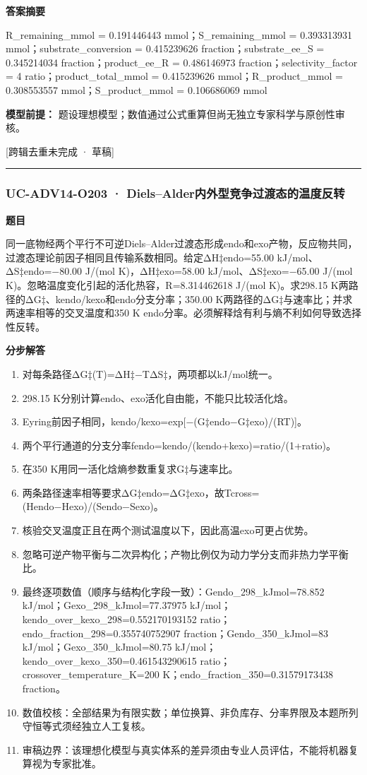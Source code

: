 \documentclass[UTF8,11pt,a4paper]{ctexart}
\begin{document}
\noindent\textbf{答案摘要}\par
R\_remaining\_mmol = 0.191446443 mmol；S\_remaining\_mmol = 0.393313931 mmol；substrate\_conversion = 0.415239626 fraction；substrate\_ee\_S = 0.345214034 fraction；product\_ee\_R = 0.486146973 fraction；selectivity\_factor = 4 ratio；product\_total\_mmol = 0.415239626 mmol；R\_product\_mmol = 0.308553557 mmol；S\_product\_mmol = 0.106686069 mmol\par
\noindent\textbf{模型前提：}
题设理想模型；数值通过公式重算但尚无独立专家科学与原创性审核。\par
\noindent\textcolor{red!65!black}{[跨辑去重未完成 · 草稿]} \par
\medskip\hrule\medskip
{}
\subsubsection*{UC-ADV14-O203 · Diels–Alder内外型竞争过渡态的温度反转}
\noindent\textbf{题目}\par
同一底物经两个平行不可逆Diels–Alder过渡态形成endo和exo产物，反应物共同，过渡态理论前因子相同且传输系数相同。给定ΔH‡endo=55.00 kJ/mol、ΔS‡endo=−80.00 J/(mol K)，ΔH‡exo=58.00 kJ/mol、ΔS‡exo=−65.00 J/(mol K)。忽略温度变化引起的活化热容，R=8.314462618 J/(mol K)。求298.15 K两路径的ΔG‡、kendo/kexo和endo分支分率；350.00 K两路径的ΔG‡与速率比；并求两速率相等的交叉温度和350 K endo分率。必须解释焓有利与熵不利如何导致选择性反转。\par
\medskip\noindent\textbf{分步解答}
\begin{enumerate}
\item 对每条路径ΔG‡(T)=ΔH‡−TΔS‡，两项都以kJ/mol统一。
\item 298.15 K分别计算endo、exo活化自由能，不能只比较活化焓。
\item Eyring前因子相同，kendo/kexo=exp[−(G‡endo−G‡exo)/(RT)]。
\item 两个平行通道的分支分率fendo=kendo/(kendo+kexo)=ratio/(1+ratio)。
\item 在350 K用同一活化焓熵参数重复求G‡与速率比。
\item 两条路径速率相等要求ΔG‡endo=ΔG‡exo，故Tcross=(Hendo−Hexo)/(Sendo−Sexo)。
\item 核验交叉温度正且在两个测试温度以下，因此高温exo可更占优势。
\item 忽略可逆产物平衡与二次异构化；产物比例仅为动力学分支而非热力学平衡比。
\item 最终逐项数值（顺序与结构化字段一致）：Gendo\_298\_kJmol=78.852 kJ/mol；Gexo\_298\_kJmol=77.37975 kJ/mol；kendo\_over\_kexo\_298=0.552170193152 ratio；endo\_fraction\_298=0.355740752907 fraction；Gendo\_350\_kJmol=83 kJ/mol；Gexo\_350\_kJmol=80.75 kJ/mol；kendo\_over\_kexo\_350=0.461543290615 ratio；crossover\_temperature\_K=200 K；endo\_fraction\_350=0.31579173438 fraction。
\item 数值校核：全部结果为有限实数；单位换算、非负库存、分率界限及本题所列守恒等式须经独立人工复核。
\item 审稿边界：该理想化模型与真实体系的差异须由专业人员评估，不能将机器复算视为专家批准。
\end{enumerate}
\end{document}
